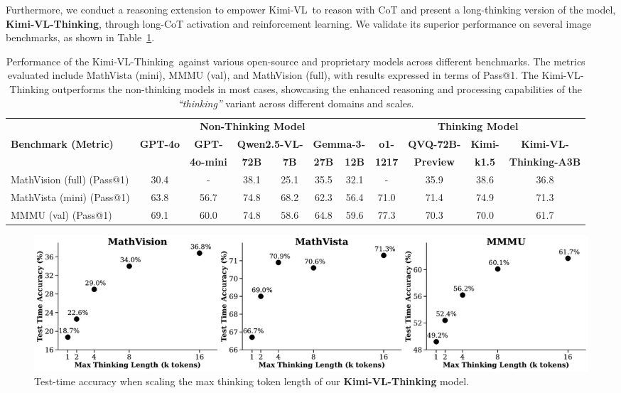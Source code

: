 \documentclass{article}
\newcommand{\ourname}{{Kimi-VL}}
\newcommand{\ourreasoningname}{{\ourname-Thinking}}
\begin{document}
Furthermore, we conduct a reasoning extension to empower \ourname~to reason with CoT and present a long-thinking version of the model, \textbf{\ourname-Thinking}, through long-CoT activation and reinforcement learning.
We validate its superior performance on several image benchmarks, as shown in Table~\ref{tab:long_perf}.



\begin{table}[t!]
\renewcommand{\arraystretch}{1.5}
\setlength{\tabcolsep}{4.0pt}
    \centering
    \footnotesize
    \begin{tabular}{l|cccccc|ccc|c}
    \toprule
    & \multicolumn{6}{c|}{\textbf{Non-Thinking Model}} & \multicolumn{4}{c}{\textbf{Thinking Model}} \\
    \textbf{Benchmark {\tiny (Metric)}}  & \multirow{2}{*}{\textbf{GPT-4o}} & \textbf{GPT-}   &\multicolumn{2}{c}{\textbf{Qwen2.5-VL-}}&\multicolumn{2}{c|}{\textbf{Gemma-3-}}  & \textbf{o1-} & \textbf{QVQ-72B-} & \textbf{Kimi-} & \textbf{\ourname-} \\
    & & \textbf{4o-mini} & \textbf{72B} & \textbf{7B} & \textbf{27B} & \textbf{12B} & \textbf{1217} & \textbf{Preview} & \textbf{k1.5} & \textbf{Thinking-A3B} \\
    \midrule
    MathVision (full) {\tiny (Pass@1)} & 30.4 & - & 38.1 & 25.1 & 35.5 & 32.1 & - & 35.9 & 38.6 & 36.8  \\
    MathVista (mini) {\tiny (Pass@1)} & 63.8 & 56.7 & 74.8 & 68.2 & 62.3 & 56.4 & 71.0 & 71.4 & 74.9 & 71.3  \\
    MMMU (val) {\tiny (Pass@1)} & 69.1 & 60.0 & 74.8 & 58.6 & 64.8 & 59.6  & 77.3 & 70.3 & 70.0 & 61.7  \\
    \bottomrule
    \end{tabular}
    \vspace{1em}
    \caption{Performance of the \ourreasoningname~against various open-source and proprietary models across different benchmarks. The metrics evaluated include MathVista (mini), MMMU (val), and MathVision (full), with results expressed in terms of Pass@1. The \ourreasoningname{} outperforms the non-thinking models in most cases, showcasing the enhanced reasoning and processing capabilities of the \textit{``thinking''} variant across different domains and scales.}
    \label{tab:long_perf}
\end{table}

\begin{figure}[t!]
    \centering
    \includegraphics[width=1.0\linewidth]{figures/test_time_accuracy.pdf}
    \caption{Test-time accuracy when scaling the max thinking token length of our \textbf{Kimi-VL-Thinking} model.}
    \label{fig:test_time_accuracy}
    \vspace{-1em}
\end{figure}
\end{document}

